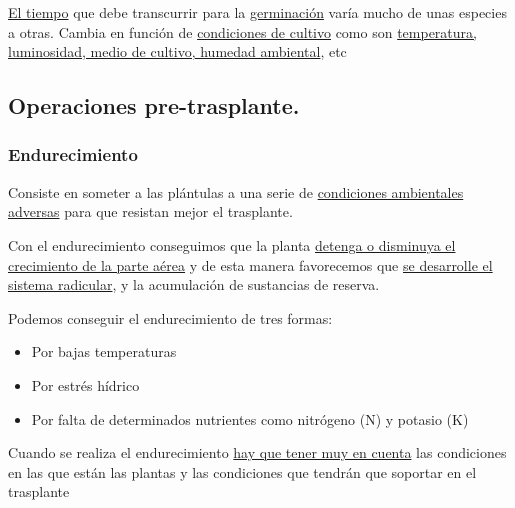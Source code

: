 \documentclass[a4paper,12pt,oneside]{article}
\begin{document}
\uline{El tiempo} que debe transcurrir para la \uline{germinación} varía mucho de unas
especies a otras. Cambia en función de \uline{condiciones de cultivo} como son
\uline{temperatura, luminosidad, medio de cultivo, humedad ambiental}, etc
\subsection{Operaciones pre-trasplante.}
\label{sec:org40f9bea}
\subsubsection{Endurecimiento}
\label{sec:orgd7fb6ed}
Consiste en someter a las plántulas a una serie de \uline{condiciones ambientales
adversas} para que resistan  mejor el trasplante.

Con el  endurecimiento conseguimos que la planta \uline{detenga o disminuya el
crecimiento de la parte aérea} y de esta manera favorecemos que \uline{se desarrolle
el sistema radicular}, y la acumulación de sustancias de reserva. 

Podemos conseguir el endurecimiento de tres formas:
\begin{itemize}
\item Por bajas temperaturas
\item Por estrés hídrico
\item Por falta de determinados nutrientes como nitrógeno (N) y potasio (K)
\end{itemize}

Cuando se realiza el endurecimiento \uline{hay que tener muy en cuenta} las
condiciones en las que están las plantas y las condiciones que tendrán que
soportar en el trasplante
\end{document}

